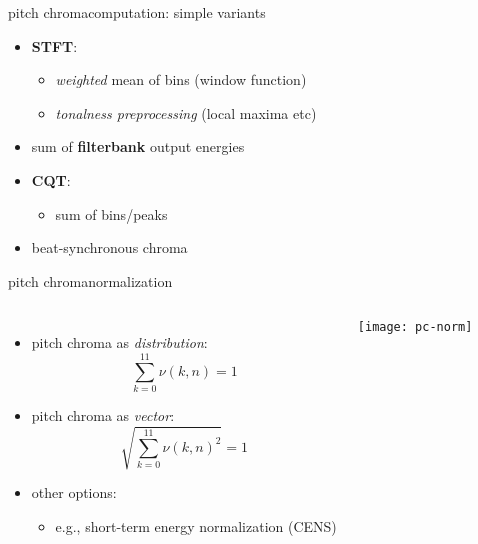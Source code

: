         \begin{frame}{pitch chroma}{computation: simple variants}
            \begin{itemize}
                \item	\textbf{STFT}: 
                    \begin{itemize}
                        \item   \textit{weighted} mean of bins (window function)
                        \item	\textit{tonalness preprocessing} (local maxima etc)
                    \end{itemize}
                \item<2->	sum of \textbf{filterbank} output energies
                \item<3->	\textbf{CQT}: 
                    \begin{itemize}
                        \item sum of bins/peaks
                    \end{itemize}
                \item<4->   beat-synchronous chroma
            \end{itemize}
        \end{frame}
        \begin{frame}{pitch chroma}{normalization}
            \begin{columns}[T]
                    \begin{itemize}
                        \item   pitch chroma as \textit{distribution}:
                            \begin{equation*}
                                \sum\limits_{k=0}^{11}{\nu(k,n)} = 1
                            \end{equation*}
                        \item<2->   pitch chroma as \textit{vector}:
                            \begin{equation*}
                                \sqrt{\sum\limits_{k=0}^{11}{\nu(k,n)^2}} = 1
                            \end{equation*}
                        \item<3-> other options:
                            \begin{itemize}
                                \item   e.g., short-term energy normalization (CENS)
                            \end{itemize}
                    \end{itemize}
                    \texttt{[image: pc-norm]}
            \end{columns}
            
        \end{frame}
